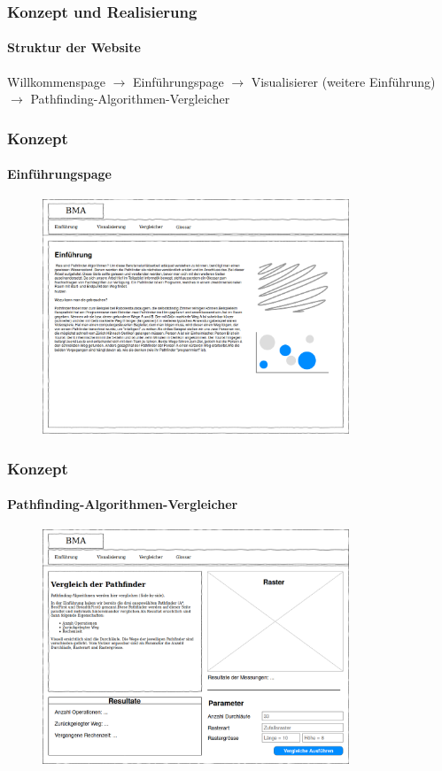 \documentclass[professionalfont,serif,german]{beamer}
\begin{document}
\begin{frame}
  \frametitle{Konzept und Realisierung}
  \framesubtitle{Struktur der Website}
  Willkommenspage $\rightarrow$ Einführungspage $\rightarrow$ Visualisierer (weitere Einführung) $\rightarrow$ Pathfinding-Algorithmen-Vergleicher
\end{frame}

\begin{frame}
  \frametitle{Konzept}
  \framesubtitle{Einführungspage}
  \begin{figure}
    \includegraphics[height=7cm]{img/einfuehrung1.png}
  \end{figure}
\end{frame}

\begin{frame}
  \frametitle{Konzept}
  \framesubtitle{Pathfinding-Algorithmen-Vergleicher}
  \begin{figure}
    \includegraphics[height=7cm]{img/konzept1.png}
  \end{figure}
\end{frame}
\end{document}

